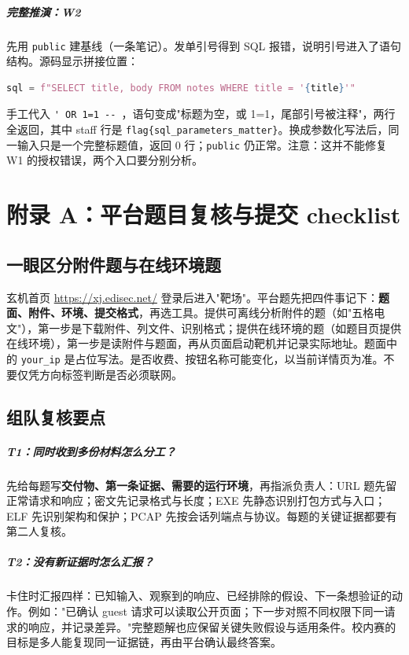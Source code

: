 \documentclass[UTF8,12pt,oneside]{ctexbook}
\begin{document}
\paragraph{完整推演：W2}
先用 \verb|public| 建基线（一条笔记）。发单引号得到 SQL 报错，说明引号进入了语句结构。源码显示拼接位置：
\begin{lstlisting}[language=Python]
sql = f"SELECT title, body FROM notes WHERE title = '{title}'"
\end{lstlisting}
手工代入 \verb|' OR 1=1 -- |，语句变成"标题为空，或 1=1，尾部引号被注释"，两行全返回，其中 staff 行是 \verb|flag{sql_parameters_matter}|。换成参数化写法后，同一输入只是一个完整标题值，返回 0 行；\verb|public| 仍正常。注意：这并不能修复 W1 的授权错误，两个入口要分别分析。

\chapter{附录 A：平台题目复核与提交 checklist}
\label{web:platform}

\section{一眼区分附件题与在线环境题}
玄机首页 \url{https://xj.edisec.net/} 登录后进入"靶场"。平台题先把四件事记下：\textbf{题面、附件、环境、提交格式}，再选工具。提供可离线分析附件的题（如"五格电文"），第一步是下载附件、列文件、识别格式；提供在线环境的题（如题目页提供在线环境），第一步是读附件与题面，再从页面启动靶机并记录实际地址。题面中的 \verb|your_ip| 是占位写法。是否收费、按钮名称可能变化，以当前详情页为准。不要仅凭方向标签判断是否必须联网。

\section{组队复核要点}
\paragraph{T1：同时收到多份材料怎么分工？}先给每题写\textbf{交付物、第一条证据、需要的运行环境}，再指派负责人：URL 题先留正常请求和响应；密文先记录格式与长度；EXE 先静态识别打包方式与入口；ELF 先识别架构和保护；PCAP 先按会话列端点与协议。每题的关键证据都要有第二人复核。

\paragraph{T2：没有新证据时怎么汇报？}卡住时汇报四样：已知输入、观察到的响应、已经排除的假设、下一条想验证的动作。例如："已确认 guest 请求可以读取公开页面；下一步对照不同权限下同一请求的响应，并记录差异。"完整题解也应保留关键失败假设与适用条件。校内赛的目标是多人能复现同一证据链，再由平台确认最终答案。
\end{document}
